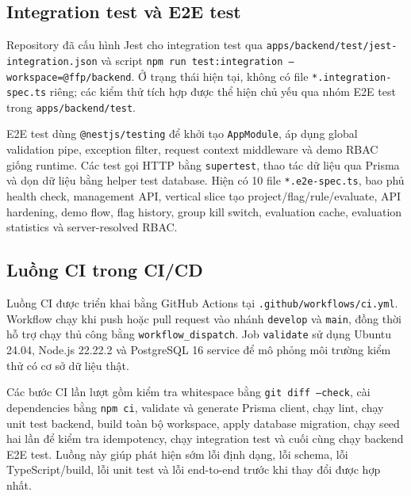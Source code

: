 \subsection{Integration test và E2E test}

Repository đã cấu hình Jest cho integration test qua \texttt{apps/backend/test/jest-integration.json} và script \texttt{npm run test:integration --workspace=@ffp/backend}. Ở trạng thái hiện tại, không có file \texttt{*.integration-spec.ts} riêng; các kiểm thử tích hợp được thể hiện chủ yếu qua nhóm E2E test trong \texttt{apps/backend/test}.

E2E test dùng \texttt{@nestjs/testing} để khởi tạo \texttt{AppModule}, áp dụng global validation pipe, exception filter, request context middleware và demo RBAC giống runtime. Các test gọi HTTP bằng \texttt{supertest}, thao tác dữ liệu qua Prisma và dọn dữ liệu bằng helper test database. Hiện có 10 file \texttt{*.e2e-spec.ts}, bao phủ health check, management API, vertical slice tạo project/flag/rule/evaluate, API hardening, demo flow, flag history, group kill switch, evaluation cache, evaluation statistics và server-resolved RBAC.

\subsection{Luồng CI trong CI/CD}

Luồng CI được triển khai bằng GitHub Actions tại \texttt{.github/workflows/ci.yml}. Workflow chạy khi push hoặc pull request vào nhánh \texttt{develop} và \texttt{main}, đồng thời hỗ trợ chạy thủ công bằng \texttt{workflow\_dispatch}. Job \texttt{validate} sử dụng Ubuntu 24.04, Node.js 22.22.2 và PostgreSQL 16 service để mô phỏng môi trường kiểm thử có cơ sở dữ liệu thật.

Các bước CI lần lượt gồm kiểm tra whitespace bằng \texttt{git diff --check}, cài dependencies bằng \texttt{npm ci}, validate và generate Prisma client, chạy lint, chạy unit test backend, build toàn bộ workspace, apply database migration, chạy seed hai lần để kiểm tra idempotency, chạy integration test và cuối cùng chạy backend E2E test. Luồng này giúp phát hiện sớm lỗi định dạng, lỗi schema, lỗi TypeScript/build, lỗi unit test và lỗi end-to-end trước khi thay đổi được hợp nhất.
